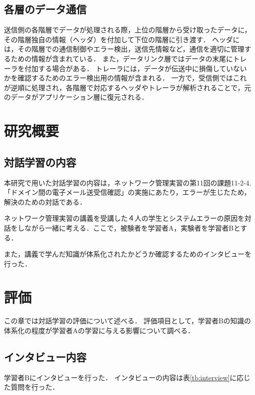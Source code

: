 \documentclass[12pt,a4j,titlepage]{ltjsarticle}
\begin{document}
\subsection{各層のデータ通信}
送信側の各階層でデータが処理される際，上位の階層から受け取ったデータに，その階層独自の情報（ヘッダ）を付加して下位の階層に引き渡す．
ヘッダには，その階層での通信制御やエラー検出，送信先情報など，通信を適切に管理するための情報が含まれている．
また，データリンク層ではデータの末尾にトレーラを付加する場合がある．
トレーラには，データが伝送中に損傷していないかを確認するためのエラー検出用の情報が含まれる．
一方で，受信側ではこれが逆順に処理され，各階層で対応するヘッダやトレーラが解析されることで，元のデータがアプリケーション層に復元される．

\section{研究概要}
\subsection{対話学習の内容}

本研究で用いた対話学習の内容は，ネットワーク管理実習の第11回の課題11-2-4. 「ドメイン間の電子メール送受信確認」の実施にあたり，エラーが生じたため，解決のための対話である．

ネットワーク管理実習の講義を受講した４人の学生とシステムエラーの原因を対話をしながら一緒に考える．ここで，被験者を学習者A，実験者を学習者Bとする．

また，講義で学んだ知識が体系化されたかどうか確認するためのインタビューを行った．

\section{評価}

この章では対話学習の評価について述べる．
評価項目として，学習者Bの知識の体系化の程度が学習者Aの学習に与える影響について調べる．


\subsection{インタビュー内容}
学習者Bにインタビューを行った．
インタビューの内容は表\ref{tb:interview}に応じた質問を行った．
\end{document}

